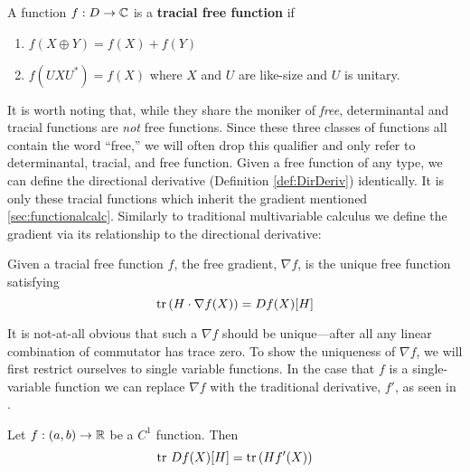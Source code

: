 \begin{definition}%
\label{def:TrFreeFun}
  A function \(f: D \to \mathbb{C} \) is a \textbf{tracial free function} if
  \begin{enumerate}
    \item \(f(X\oplus Y) = f(X)+f(Y)\)
    \item \(f(U X U^*) = f(X)\) where \(X\) and \(U\) are like-size
          and \(U\) is unitary.
  \end{enumerate}
\end{definition}

It is worth noting that, while they share the moniker of \emph{free},
determinantal and tracial functions are \emph{not} free functions.
Since these three classes of functions all contain the word ``free,'' we will
often drop this qualifier and only refer to determinantal, tracial, and free
function.  Given a free function of any type, we can define the directional
derivative (Definition \ref{def:DirDeriv}) identically. It is only these tracial functions which inherit
the gradient mentioned \cref{sec:functionalcalc}.  Similarly to traditional multivariable calculus
we define the gradient via its relationship to the directional derivative:
\begin{definition}%
\label{def:FreeGrad}
  Given a tracial free function \(f\), the free gradient, \(\nabla f\), is the
  unique free function satisfying
  \[
    \operatorname{tr} \left( H \cdot \nabla f(X) \right) = Df(X)[H]
  \]
\end{definition}

It is not-at-all obvious that such a \(\nabla f \) should be unique---after all
any linear combination of commutator has trace zero. To show the uniqueness of
\(\nabla f\), we will first restrict ourselves to single variable functions. In the case that \(f\)
is a single-variable function we can replace \(\nabla f\) with the traditional
derivative, \(f'\), as seen in
\cite[Thm 3.3]{pascoeTrace2020}.
\begin{theorem}
  Let \(f: (a,b)\to \mathbb{R} \) be a \(C^1\) function. Then
  \[
    \operatorname{tr} \, Df(X)[H] = \operatorname{tr} \left( Hf'(X) \right)
  \]
\end{theorem}

